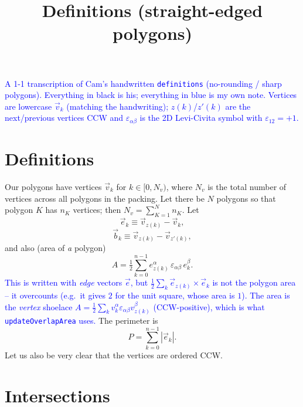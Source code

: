 \documentclass[11pt]{article}
\title{Definitions (straight-edged polygons)}
\author{}
\date{}
\numberwithin{equation}{section}
\newcommand{\vv}[1]{\vec{#1}}
\newcommand{\eps}{\varepsilon}
\newcommand{\half}{\tfrac{1}{2}}
\newcommand{\cam}[1]{\textcolor{blue}{#1}}
\begin{document}
\maketitle

\cam{\small A 1-1 transcription of Cam's handwritten \texttt{definitions} (no-rounding / sharp
polygons). Everything in black is his; \textcolor{blue}{everything in blue is my own note}. Vertices
are lowercase $\vv v_k$ (matching the handwriting); $z(k)$/$z'(k)$ are the next/previous vertices CCW
and $\eps_{\alpha\beta}$ is the 2D Levi-Civita symbol with $\eps_{12}=+1$.}

\section{Definitions}

Our polygons have vertices $\vv v_k$ for $k\in[0,N_v)$, where $N_v$ is the total number of vertices
across all polygons in the packing. Let there be $N$ polygons so that polygon $K$ has $n_K$
vertices; then $N_v=\sum_{K=1}^{N}n_K$. Let
\begin{equation}
  \vv e_k\equiv\vv v_{z(k)}-\vv v_k,
\end{equation}
\begin{equation}
  \vv b_k\equiv\vv v_{z(k)}-\vv v_{z'(k)},
\end{equation}
and also (area of \emph{a} polygon)
\begin{equation}
  A=\half\sum_{k=0}^{n-1}e_{z(k)}^{\alpha}\,\eps_{\alpha\beta}\,e_k^{\beta}.
\end{equation}
\cam{This is written with \emph{edge} vectors $\vv e$, but $\half\sum_k \vv e_{z(k)}\times\vv e_k$ is
not the polygon area -- it overcounts (e.g.\ it gives $2$ for the unit square, whose area is $1$). The
area is the \emph{vertex} shoelace $A=\half\sum_k v_k^{\alpha}\eps_{\alpha\beta}v_{z(k)}^{\beta}$
(CCW-positive), which is what \texttt{updateOverlapArea} uses.} The perimeter is
\begin{equation}
  P=\sum_{k=0}^{n-1}|\vv e_k|.
\end{equation}
Let us also be very clear that the vertices are ordered CCW.

\section{Intersections}
\end{document}
